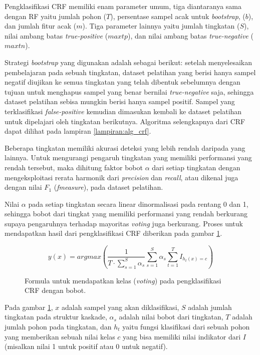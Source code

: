 Pengklasifikasi CRF memiliki enam parameter umum, tiga diantaranya sama dengan
RF yaitu jumlah pohon ($T$), persentase sampel acak untuk \textit{bootstrap},
($b$), dan jumlah fitur acak ($m$).
Tiga parameter lainnya yaitu jumlah tingkatan ($S$), nilai ambang batas
\textit{true-positive} ($maxtp$), dan nilai ambang batas
\textit{true-negative} ($maxtn$).

Strategi \textit{bootstrap} yang digunakan adalah sebagai berikut: setelah
menyelesaikan pembelajaran pada sebuah tingkatan, dataset pelatihan yang berisi
hanya sampel negatif diujikan ke semua tingkatan yang telah dibentuk
sebelumnya dengan tujuan untuk menghapus sampel yang benar bernilai
\textit{true-negative} saja, sehingga dataset pelatihan sebisa mungkin berisi
hanya sampel positif.
Sampel yang terklasifikasi \textit{false-positive} kemudian dimasukan kembali
ke dataset pelatihan untuk dipelajari oleh tingkatan berikutnya.
Algoritma selengkapnya dari CRF dapat dilihat pada lampiran
\ref{lampiran:alg_crf}.

Beberapa tingkatan memiliki akurasi deteksi yang lebih rendah daripada
yang lainnya.
Untuk mengurangi pengaruh tingkatan yang memiliki performansi yang rendah
tersebut, maka dihitung faktor bobot $\alpha$ dari setiap tingkatan dengan
mengeksploitasi rerata harmonik dari \textit{precision} dan \textit{recall},
atau dikenal juga dengan nilai $F_1$ (\textit{fmeasure}),
pada dataset pelatihan.

Nilai $\alpha$ pada setiap tingkatan secara linear dinormalisasi pada rentang 0
dan 1, sehingga bobot dari tingkat yang memiliki performansi yang rendah
berkurang supaya pengaruhnya terhadap mayoritas \textit{voting} juga berkurang.
Proses untuk mendapatkan hasil dari pengklasifikasi CRF diberikan pada gambar
\ref{form:crf}.

\begin{figure}[h]
\[
	y(x) = argmax \left(
			\frac{1}{T \cdot \sum^{S}_{s=1} \alpha_{s} }
			\sum\limits_{s=1}^{S} \alpha_{s}
			\sum\limits^{T}_{t=1} I_{h_{t} (x) = c}
		\right)
\]
\caption{
Formula untuk mendapatkan kelas (\textit{voting}) pada pengklasifikasi CRF
dengan bobot.
}
\label{form:crf}
\end{figure}

Pada gambar \ref{form:crf}, $x$ adalah sampel yang akan diklasifikasi,
$S$ adalah jumlah tingkatan pada struktur kaskade,
$\alpha_{s}$ adalah nilai bobot dari tingkatan,
$T$ adalah jumlah pohon pada tingkatan, dan
$h_{t}$ yaitu fungsi klasifikasi dari sebuah pohon yang memberikan sebuah nilai
kelas $c$ yang bisa memiliki nilai indikator dari $I$
(misalkan nilai 1 untuk positif atau 0 untuk negatif).

